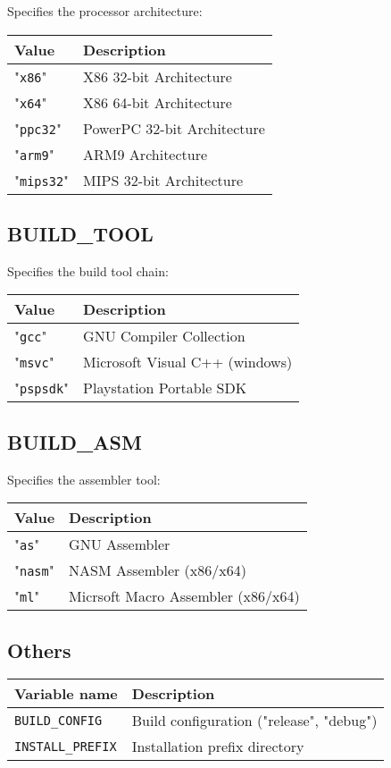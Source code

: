 \documentclass{article}
\newcommand{\var}[1]{{\tt #1}}
\newcommand{\val}[1]{"{\tt #1}"}
\begin{document}
Specifies the processor architecture:

\begin{tabular}{ll}
Value        & Description                 \\
\hline
\val{x86}    & X86 32-bit Architecture     \\
\val{x64}    & X86 64-bit Architecture     \\
\val{ppc32}  & PowerPC 32-bit Architecture \\
\val{arm9}   & ARM9 Architecture           \\
\val{mips32} & MIPS 32-bit Architecture    \\
\end{tabular}

\subsection{BUILD\_TOOL}

Specifies the build tool chain:

\begin{tabular}{ll}
Value      & Description             \\
\hline
\val{gcc}  & GNU Compiler Collection \\
\val{msvc} & Microsoft Visual C++ (windows) \\
\val{pspsdk} & Playstation Portable SDK \\
\end{tabular}

\subsection{BUILD\_ASM}

Specifies the assembler tool:

\begin{tabular}{ll}
Value      & Description              \\
\hline
\val{as}   & GNU Assembler            \\
\val{nasm} & NASM Assembler (x86/x64) \\
\val{ml}   & Micrsoft Macro Assembler (x86/x64)\\
\end{tabular}

\subsection{Others}

\begin{tabular}{ll}
Variable name		& Description		\\
\hline
\var{BUILD\_CONFIG}	& Build configuration ("release", "debug") \\
\var{INSTALL\_PREFIX}	& Installation prefix directory \\
\end{tabular}
\end{document}
